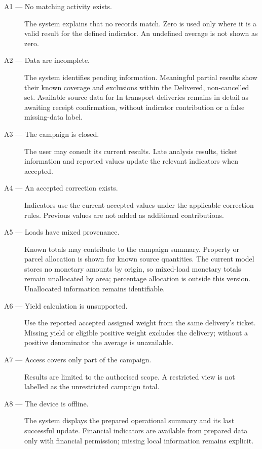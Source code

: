 \begin{description}

    \item[A1 --- No matching activity exists.]
    The system explains that no records match.
    Zero is used only where it is a valid
    result for the defined indicator.
    An undefined average is not shown as zero.

    \item[A2 --- Data are incomplete.]
    The system identifies pending information.
    Meaningful partial results show their known coverage and exclusions within
    the Delivered, non-cancelled set. Available source data for In transport
    deliveries remains in detail as awaiting receipt confirmation, without
    indicator contribution or a false missing-data label.

    \item[A3 --- The campaign is closed.]
    The user may consult its current results.
    Late analysis results, ticket information
    and reported values update the relevant
    indicators when accepted.

    \item[A4 --- An accepted correction exists.]
    Indicators use the current accepted values
    under the applicable correction rules.
    Previous values are not added
    as additional contributions.

    \item[A5 --- Loads have mixed provenance.]
    Known totals may contribute
    to the campaign summary.
    Property or parcel allocation is shown for known source quantities. The current model stores no monetary amounts by origin, so mixed-load monetary totals remain unallocated by area; percentage allocation is outside this version.
    Unallocated information remains identifiable.

    \item[A6 --- Yield calculation is unsupported.]
    Use the reported accepted assigned weight from the same delivery's ticket. Missing yield or eligible positive weight excludes the delivery; without a positive denominator the average is unavailable.

    \item[A7 --- Access covers only part
    of the campaign.]
    Results are limited to the authorised scope.
    A restricted view is not labelled
    as the unrestricted campaign total.

    \item[A8 --- The device is offline.]
    The system displays the prepared
    operational summary and its last
    successful update.
    Financial indicators are available from prepared data only with financial permission; missing local information remains explicit.


\end{description}
